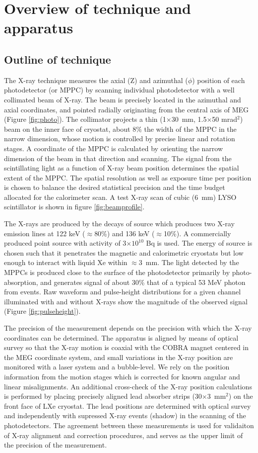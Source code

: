 \section{\label{sec:technique}Overview of technique and apparatus}
\subsection{Outline of technique}
The X-ray technique measures the axial (Z) and azimuthal ($\phi$)
position of each photodetector (or MPPC) by scanning individual
photodetector with a well collimated beam of X-ray. The beam is
precisely located in the azimuthal and axial coordinates, and pointed
radially originating from the central axis of MEG (Figure
\ref{fig:photo}).  The collimator projects a thin (1$\times$30~mm, 1.5$\times$50
mrad$^2$) beam on the inner face of cryostat, about 8\% the width of
the MPPC in the narrow dimension, whose motion is controlled by
precise linear and rotation stages. A coordinate of the
MPPC is calculated by orienting the narrow dimension of the beam in
that direction and scanning. The signal from the scintillating light
as a function of X-ray beam position determines the spatial extent of
the MPPC. The spatial resolution as well as exposure time per position
is chosen to balance the desired statistical precision and the time
budget allocated for the calorimeter scan. A test X-ray scan of cubic
(6~mm) LYSO scintillator is shown in figure \ref{fig:beamprofile}.

The X-rays are produced by the decays of \cob source which produces
two X-ray emission lines at 122 keV ($\approx$80\%) and 136 keV
($\approx$10\%).  A commercially produced point source with
activity of 3$\times 10^{10}$ Bq is used. The energy of source is
chosen such that it penetrates the magnetic and calorimetric cryostats
but low enough to interact with liquid Xe within $\approx$3~mm. The light
detected by the MPPCs is produced close to the surface of the
photodetector primarily by photo-absorption, and generates signal of
about 30\% that of a typical 53 MeV photon from \mueg events. Raw
waveform and pulse-height distributions for a given channel
illuminated with and without X-rays show the magnitude of the observed
signal (Figure \ref{fig:pulseheight}).

The precision of the measurement depends on the precision with which the X-ray
coordinates can be determined.  The apparatus is aligned by means of optical
survey so that the X-ray motion is coaxial with the COBRA magnet centered in
the MEG coordinate system, and small variations in the X-ray position are
monitored with a laser system and a bubble-level.  We rely on the position
information from the motion stages which is corrected for known angular and
linear misalignments.  An additional cross-check of the X-ray position
calculations is performed by placing precisely aligned lead absorber strips
(30$\times$3~mm$^2$) on the front face of LXe cryostat.  The lead positions are
determined with optical survey and independently with supressed X-ray events
(shadow) in the scanning of the photodetectors.  The agreement between these
measurements is used for validaiton of X-ray alignment and correction
procedures, and serves as the upper limit of the precision of the measurement. 

